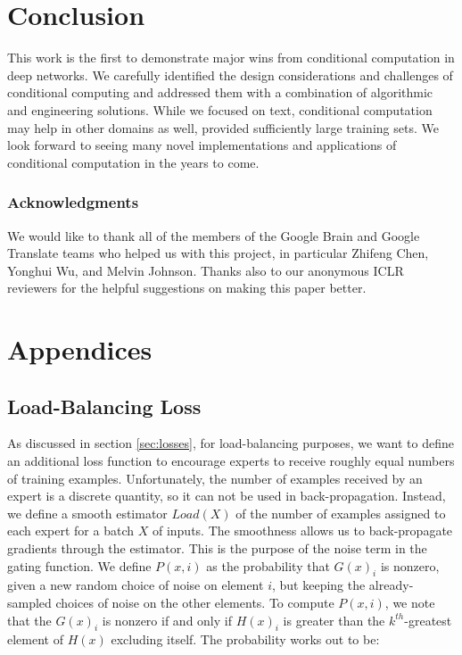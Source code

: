\documentclass{article}
\begin{document}
\vspace{-8pt}\section{Conclusion}\label{sec:conc}

This work is the first to demonstrate major wins from conditional computation in deep networks.  We carefully identified the design considerations and challenges of conditional computing and addressed them with a combination of algorithmic and engineering solutions. While we focused on text, conditional computation may help in other domains as well, provided sufficiently large training sets. We look forward to seeing many novel implementations and applications of conditional computation in the years to come.

\subsubsection*{Acknowledgments}
We would like to thank all of the members of the Google Brain and Google Translate teams who helped us with this project, in particular Zhifeng Chen, Yonghui Wu, and Melvin Johnson.  Thanks also to our anonymous ICLR reviewers for the helpful suggestions on making this paper better.




\newpage
\appendix
\section*{Appendices}
\renewcommand{\thesubsection}{\Alph{subsection}}

\subsection{Load-Balancing Loss} \label{sec:load}

As discussed in section \ref{sec:losses}, for load-balancing purposes, we want to define an additional loss function to encourage experts to receive roughly equal numbers of training examples.  Unfortunately, the number of examples received by an expert is a discrete quantity, so it can not be used in back-propagation.  Instead, we define a smooth estimator $Load(X)$ of the number of examples assigned to each expert for a batch $X$ of inputs.  The smoothness allows us to back-propagate gradients through the estimator.  This is the purpose of the noise term in the gating function.  We define $P(x, i)$ as the probability that $G(x)_i$ is nonzero, given a new random choice of noise on element $i$, but keeping the already-sampled choices of noise on the other elements.  To compute $P(x, i)$, we note that the $G(x)_i$ is nonzero if and only if $H(x)_i$ is greater than the $k^{th}$-greatest element of $H(x)$ excluding itself. The probability works out to be:
\end{document}
